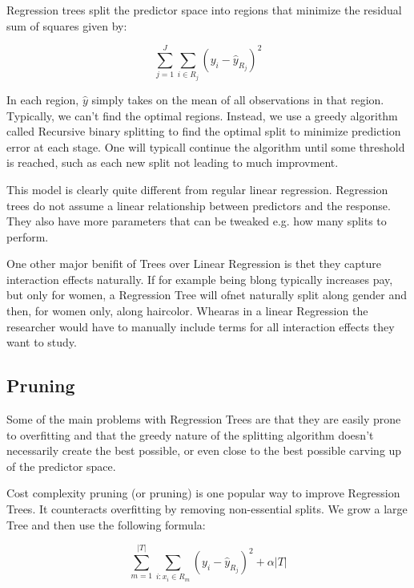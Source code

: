 \documentclass[12pt]{article}
\begin{document}
Regression trees split the predictor space into regions that minimize the residual sum of squares given by:

\begin{equation}
    \sum_{j=1}^{J} \sum_{i \in R_j} ( y_i- \hat{ y}_{R_j} )^2
\end{equation}


In each region, $\hat{y}$ simply takes on the mean of all observations in that region. Typically, we can't find the optimal regions. Instead, we use a greedy algorithm called Recursive binary splitting to find the optimal split to minimize prediction error at each stage. One will typicall continue the algorithm until some threshold is reached, such as each new split not leading to much improvment.

This model is clearly quite different from regular linear regression. Regression trees do not assume a linear relationship between predictors and the response. They also have more parameters that can be tweaked e.g. how many splits to perform. 

One other major benifit of Trees over Linear Regression is thet they capture interaction effects naturally. If for example being blong typically increases pay, but only for women, a Regression Tree will ofnet naturally split along gender and then, for women only, along haircolor. Whearas in a linear Regression the researcher would have to manually include terms for all interaction effects they want to study.

\subsection{Pruning}

Some of the main problems with Regression Trees are that they are easily prone to overfitting and that the greedy nature of the splitting algorithm doesn't necessarily create the best possible, or even close to the best possible carving up of the predictor space.




Cost complexity pruning (or pruning) is one popular way to improve Regression Trees. It counteracts overfitting by removing non-essential splits. We grow a large Tree and then use the following formula:

\begin{equation}
    \sum_{m=1}^{|T|} \sum_{i: x_i \in R_m} (y_i - \hat{y}_{R_j})^2 + \alpha|T|
\end{equation}
\end{document}
